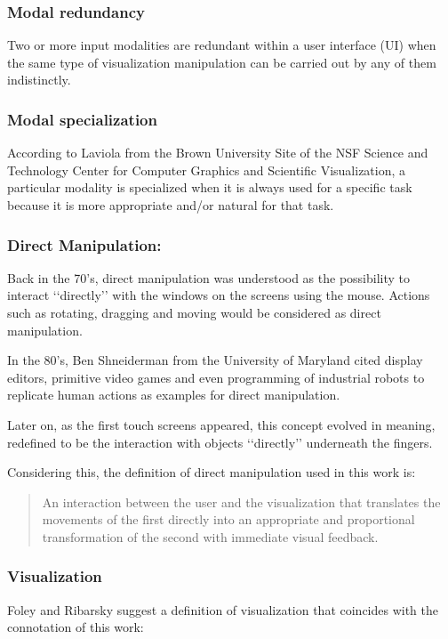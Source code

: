 \documentclass[12pt]{extarticle}
\begin{document}
\subsubsection {Modal redundancy}
Two or more input modalities are redundant within a user interface (UI) when the same type of visualization manipulation can be carried out by any of them indistinctly.

\subsubsection {Modal specialization}
According to Laviola\cite{MSVTK} from the Brown University Site of the NSF Science and Technology Center for Computer Graphics and Scientific Visualization, a particular modality is specialized when it is always used for a specific task because it is more appropriate and/or natural for that task.\\

\subsubsection {Direct Manipulation:} Back in the 70\rq{}s, direct manipulation was understood as the possibility to interact \lq\lq{}directly\rq\rq{} with the windows on the screens using the mouse. Actions such as rotating, dragging and moving would be considered as direct manipulation.

In the 80\rq{}s, Ben Shneiderman from the University of Maryland \cite{DirManSh} cited display editors, primitive video games and even programming of industrial robots to replicate human actions as examples for direct manipulation.

Later on, as the first touch screens appeared, this concept evolved in meaning, redefined to be the interaction with objects \lq\lq{}directly\rq\rq{} underneath the fingers.

Considering this, the definition of direct manipulation used in this work is:
\begin{quotation}
An interaction between the user and the visualization that translates the movements of the first directly into an appropriate and proportional transformation of the second with immediate visual feedback.
\end{quotation}

\subsubsection {Visualization} Foley and Ribarsky suggest a definition of visualization that coincides with the connotation of this work: \cite{FoleyVisualization}
\end{document}
